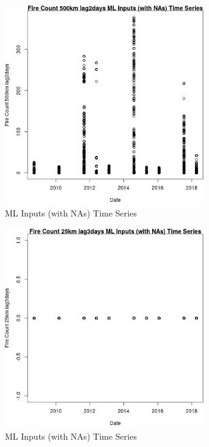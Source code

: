 \begin{figure} 
\centering  
\includegraphics[width=0.77\textwidth]{Code_Outputs/Report_ML_input_PM25_Step4_part_e_de_duplicated_aves_compiled_2019-05-18wNAs_Fire_Count_500km_lag2daysvDate.jpg} 
\caption{\label{fig:Report_ML_input_PM25_Step4_part_e_de_duplicated_aves_compiled_2019-05-18wNAsFire_Count_500km_lag2daysvDate}ML Inputs (with NAs) Time Series} 
\end{figure} 
 

\clearpage 

\begin{figure} 
\centering  
\includegraphics[width=0.77\textwidth]{Code_Outputs/Report_ML_input_PM25_Step4_part_e_de_duplicated_aves_compiled_2019-05-18wNAs_Fire_Count_25km_lag3daysvDate.jpg} 
\caption{\label{fig:Report_ML_input_PM25_Step4_part_e_de_duplicated_aves_compiled_2019-05-18wNAsFire_Count_25km_lag3daysvDate}ML Inputs (with NAs) Time Series} 
\end{figure} 
 


